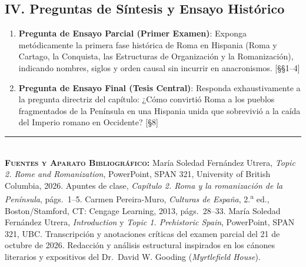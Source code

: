 \documentclass[11pt,letterpaper]{article}
\begin{document}
\subsection*{IV. Preguntas de Síntesis y Ensayo Histórico}
\begin{enumerate}[resume]
  \item \textbf{Pregunta de Ensayo Parcial (Primer Examen)}: Exponga metódicamente la primera fase histórica de Roma en Hispania (Roma y Cartago, la Conquista, las Estructuras de Organización y la Romanización), indicando nombres, siglos y orden causal sin incurrir en anacronismos. [§§1--4]
  \item \textbf{Pregunta de Ensayo Final (Tesis Central)}: Responda exhaustivamente a la pregunta directriz del capítulo: ¿Cómo convirtió Roma a los pueblos fragmentados de la Península en una Hispania unida que sobrevivió a la caída del Imperio romano en Occidente? [§8]
\end{enumerate}

\vfill
\noindent\rule{\linewidth}{0.4pt}\\[0.3em]
{\footnotesize\color{black!60}%
\textbf{\textsc{Fuentes y Aparato Bibliográfico:}} María Soledad Fernández Utrera, \emph{Topic 2. Rome and Romanization}, PowerPoint, SPAN 321, University of British Columbia, 2026. Apuntes de clase, \emph{Capítulo 2. Roma y la romanización de la Península}, págs.~1--5. Carmen Pereira-Muro, \emph{Culturas de España}, 2.\textsuperscript{a} ed., Boston/Stamford, CT: Cengage Learning, 2013, págs.~28--33. María Soledad Fernández Utrera, \emph{Introduction} y \emph{Topic 1. Prehistoric Spain}, PowerPoint, SPAN 321, UBC. Transcripción y anotaciones críticas del examen parcial del 21 de octubre de 2026. Redacción y análisis estructural inspirados en los cánones literarios y expositivos del Dr.~David W. Gooding (\emph{Myrtlefield House}).}
\end{document}
